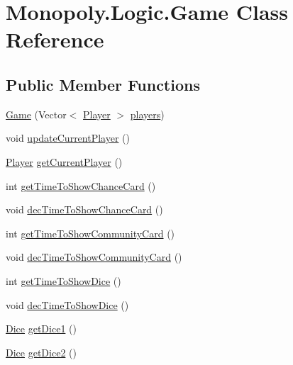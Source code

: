 \hypertarget{class_monopoly_1_1_logic_1_1_game}{}\section{Monopoly.\+Logic.\+Game Class Reference}
\label{class_monopoly_1_1_logic_1_1_game}
\subsection*{Public Member Functions}
\begin{DoxyCompactItemize}
\item 
\hyperlink{class_monopoly_1_1_logic_1_1_game_a6b50a9d7c49c5ca0d91c7816bd8acff1}{Game} (Vector$<$ \hyperlink{class_monopoly_1_1_logic_1_1_player}{Player} $>$ \hyperlink{class_monopoly_1_1_logic_1_1_game_abc3b3d5d0514ad27889ffd8f80cb58e9}{players})
\item 
void \hyperlink{class_monopoly_1_1_logic_1_1_game_ac1f42351fd4a85b901980a55e4c31d3b}{update\+Current\+Player} ()
\item 
\hyperlink{class_monopoly_1_1_logic_1_1_player}{Player} \hyperlink{class_monopoly_1_1_logic_1_1_game_a021296358e355211fd5bae130913fb69}{get\+Current\+Player} ()
\item 
int \hyperlink{class_monopoly_1_1_logic_1_1_game_ab226e5b690f112558bb8ded71b05c20d}{get\+Time\+To\+Show\+Chance\+Card} ()
\item 
void \hyperlink{class_monopoly_1_1_logic_1_1_game_af9e8e20ebc891268109b88a25dc9eb80}{dec\+Time\+To\+Show\+Chance\+Card} ()
\item 
int \hyperlink{class_monopoly_1_1_logic_1_1_game_a9b3125adc9310ef49ad506298f107c57}{get\+Time\+To\+Show\+Community\+Card} ()
\item 
void \hyperlink{class_monopoly_1_1_logic_1_1_game_a09f7df920d800e29dc497a4843428f96}{dec\+Time\+To\+Show\+Community\+Card} ()
\item 
int \hyperlink{class_monopoly_1_1_logic_1_1_game_a2a2b58d4f6e972d09458e4ae4aa119f4}{get\+Time\+To\+Show\+Dice} ()
\item 
void \hyperlink{class_monopoly_1_1_logic_1_1_game_a5023ffc3fbe7533821fc2e522f5b0ada}{dec\+Time\+To\+Show\+Dice} ()
\item 
\hyperlink{class_monopoly_1_1_logic_1_1_dice}{Dice} \hyperlink{class_monopoly_1_1_logic_1_1_game_ae66cbd6a5c2d72c7e51e2508c3796726}{get\+Dice1} ()
\item 
\hyperlink{class_monopoly_1_1_logic_1_1_dice}{Dice} \hyperlink{class_monopoly_1_1_logic_1_1_game_a9a502d8b153c4c1ce0738b76e15fe0e6}{get\+Dice2} ()

\end{DoxyCompactItemize}
